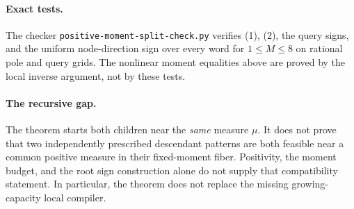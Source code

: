 \documentclass[11pt]{article}
\begin{document}
\paragraph{Exact tests.}
The checker \texttt{positive-moment-split-check.py} verifies (1), (2),
the query signs, and the uniform node-direction sign over every word
for $1\leq M\leq8$ on rational pole and query grids. The nonlinear
moment equalities above are proved by the local inverse argument, not
by these tests.

\paragraph{The recursive gap.}
The theorem starts both children near the \emph{same} measure $\mu$.
It does not prove that two independently prescribed descendant patterns
are both feasible near a common positive measure in their fixed-moment
fiber. Positivity, the moment budget, and the root sign construction
alone do not supply that compatibility statement. In particular, the
theorem does not replace the missing growing-capacity local compiler.
\end{document}
